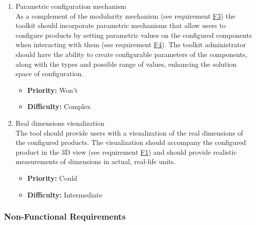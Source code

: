 \begin{enumerate}[label=\textbf{F\arabic*:}, leftmargin=*]
\item \label{itm:F20} Parametric configuration mechanism
\vspace{2pt}
\\As a complement of the modularity mechanism (see requirement \hyperref[itm:F3]{F3}) the toolkit should incorporate parametric mechanisms that allow users to configure products by setting parametric values on the configured components when interacting with them (see requirement \hyperref[itm:F4]{F4}). The toolkit administrator should have the ability to create configurable parameters of the components, along with the types and possible range of values, enhancing the solution space of configuration.
\begin{itemize}[noitemsep, label=\trianglebullet]
    \item \textbf{Priority:} Won't
    \item \textbf{Difficulty:} Complex
\end{itemize}
\vspace{4pt}

\item \label{itm:F21} Real dimensions visualization
\vspace{2pt}
\\The tool should provide users with a visualization of the real dimensions of the configured products. The visualization should accompany the configured product in the 3D view (see requirement \hyperref[itm:F1]{F1}) and should provide realistic measurements of dimensions in actual, real-life units.
\begin{itemize}[noitemsep, label=\trianglebullet]
    \item \textbf{Priority:} Could
    \item \textbf{Difficulty:} Intermediate
\end{itemize}

\end{enumerate}


\subsubsection{Non-Functional Requirements}

